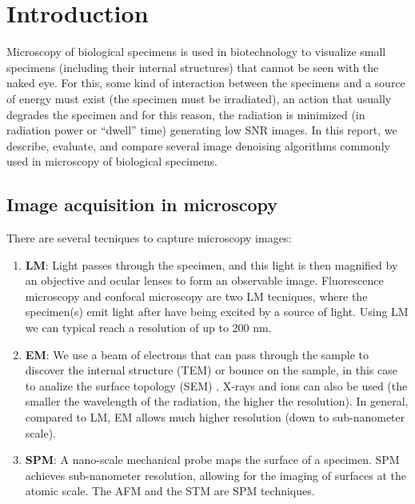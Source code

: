 \chapter{Introduction}

Microscopy of biological specimens is used in biotechnology to
visualize small specimens (including their internal structures) that
cannot be seen with the naked eye. For this, some kind of interaction
between the specimens and a source of energy must exist (the specimen
must be irradiated), an action that usually degrades the specimen and
for this reason, the radiation is minimized (in radiation power or
``dwell'' time) generating low SNR images. In this report, we describe,
evaluate, and compare several image denoising algorithms commonly used
in microscopy of biological specimens.

\section{Image acquisition in microscopy}

There are several tecniques to capture microscopy images:

\begin{enumerate}
  \item \textbf{\gls{LM}}: Light passes through the specimen, and this light
  is then magnified by an objective and ocular lenses to form an
  observable image. Fluorescence microscopy and confocal microscopy
  are two \gls{LM} tecniques, where the specimen(s) emit light after
  have being excited by a source of light. Using \gls{LM} we can
  typical reach a resolution of up to 200 nm.

\item \textbf{\gls{EM}}: We use a beam of electrons that can pass
  through the sample to discover the internal structure (\gls{TEM}) or
  bounce on the sample, in this case to analize the surface topology
  (\gls{SEM}) \cite{timischl2012statistical}. X-rays and ions can also
  be used (the smaller the wavelength of the radiation, the higher the
  resolution). In general, compared to \gls{LM}, \gls{EM} allows much
  higher resolution (down to sub-nanometer scale).

\item \textbf{\gls{SPM}}: A nano-scale mechanical probe maps the surface of a
  specimen. \gls{SPM} achieves sub-nanometer resolution, allowing for
  the imaging of surfaces at the atomic scale. The \gls{AFM} and the
  \gls{STM} are \gls{SPM} techniques.

\end{enumerate}
  
